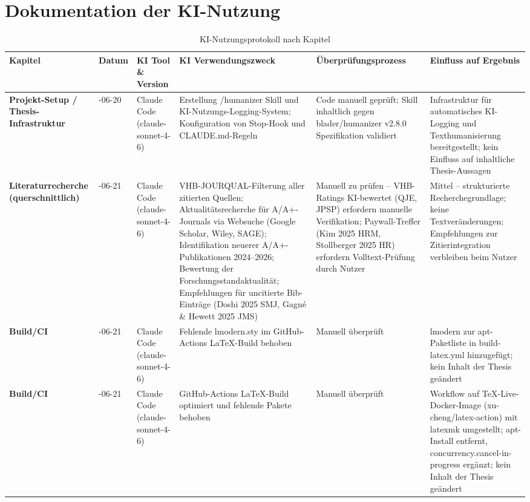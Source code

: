 \documentclass[a4paper]{report}
\begin{document}
\chapter{Dokumentation der KI-Nutzung}

\begin{table}[ht]
\centering
\footnotesize
\renewcommand{\arraystretch}{1.4}
\begin{tabular}{
  >{\RaggedRight\bfseries}p{3cm}
  >{\RaggedRight}p{1.6cm}
  >{\RaggedRight}p{2.8cm}
  >{\RaggedRight}p{4.5cm}
  >{\RaggedRight}p{4.5cm}
  >{\RaggedRight}p{4cm}
}
\toprule
\textbf{Kapitel} & \textbf{Datum} & \textbf{KI Tool \& Version} & \textbf{KI Verwendungszweck} & \textbf{Überprüfungsprozess} & \textbf{Einfluss auf Ergebnis} \\
\midrule
  Projekt-Setup / Thesis-Infrastruktur
    & 2026-06-20
    & Claude Code (claude-sonnet-4-6)
    & Erstellung /humanizer Skill und KI-Nutzungs-Logging-System; Konfiguration von Stop-Hook und CLAUDE.md-Regeln
    & Code manuell geprüft; Skill inhaltlich gegen blader/humanizer v2.8.0 Spezifikation validiert
    & Infrastruktur für automatisches KI-Logging und Texthuman­isierung bereitgestellt; kein Einfluss auf inhaltliche Thesis-Aussagen \\
\midrule
  Literaturrecherche (querschnittlich)
    & 2026-06-21
    & Claude Code (claude-sonnet-4-6)
    & VHB-JOURQUAL-Filterung aller zitierten Quellen; Aktualitätsrecherche für A/A+-Journals via Websuche (Google Scholar, Wiley, SAGE); Identifikation neuerer A/A+-Publikationen 2024–2026; Bewertung der Forschungsstandaktualität; Empfehlungen für uncitierte Bib-Einträge (Doshi 2025 SMJ, Gagné \& Hewett 2025 JMS)
    & Manuell zu prüfen – VHB-Ratings KI-bewertet (QJE, JPSP) erfordern manuelle Verifikation; Paywall-Treffer (Kim 2025 HRM, Stollberger 2025 HR) erfordern Volltext-Prüfung durch Nutzer
    & Mittel – strukturierte Recherchegrundlage; keine Textveränderungen; Empfehlungen zur Zitierintegration verbleiben beim Nutzer \\
\midrule
  Build/CI
    & 2026-06-21
    & Claude Code (claude-sonnet-4-6)
    & Fehlende lmodern.sty im GitHub-Actions LaTeX-Build behoben
    & Manuell überprüft
    & lmodern zur apt-Paketliste in build-latex.yml hinzugefügt; kein Inhalt der Thesis geändert \\
\midrule
  Build/CI
    & 2026-06-21
    & Claude Code (claude-sonnet-4-6)
    & GitHub-Actions LaTeX-Build optimiert und fehlende Pakete behoben
    & Manuell überprüft
    & Workflow auf TeX-Live-Docker-Image (xu-cheng/latex-action) mit latexmk umgestellt; apt-Install entfernt, concurrency.cancel-in-progress ergänzt; kein Inhalt der Thesis geändert \\
\bottomrule
\end{tabular}
\caption{KI-Nutzungsprotokoll nach Kapitel}
\label{tab:ki-protokoll}
\end{table}
\end{document}
